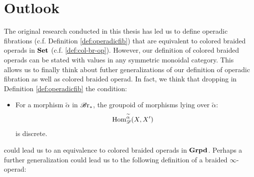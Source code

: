 \section{Outlook}


The original research conducted in this thesis has led us to
define operadic fibrations (c.f. Definition \ref{def:operadicfib}) that
are equivalent to colored braided operads in $\operatorname{\textbf{Set}}$ (c.f. \ref{def:col-br-op}). However, our definition of colored braided operads
can be stated with values in any symmetric monoidal category. This allows us to finally think about futher generalizations of our definition of operadic fibration as well as colored braided operad.
In fact, we think that
dropping in Definition \ref{def:operadicfib} the condition:
\begin{itemize}
    \item [(iii)] For a morphism $\widetilde{\alpha}$ in $\mathscr{B} \text{r}_{\ast}$, the groupoid of
    morphisms lying over $\widetilde{\alpha}$:
    $$\operatorname{Hom}_{\mathscr{D}}^{\widetilde{\alpha}}(X, X')$$ is discrete.
\end{itemize}
could lead us to an equivalence to colored braided operads
in $\operatorname{\textbf{Grpd}}$.
Perhaps a further generalization could lead us to the following definition of a braided $\infty$-operad:

